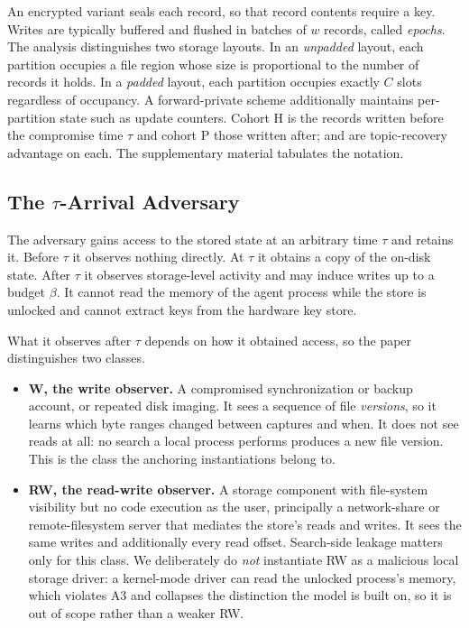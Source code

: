 An encrypted variant seals each record, so that record contents require a key. Writes are
typically buffered and flushed in batches of $w$ records, called \emph{epochs}. The
analysis distinguishes two storage layouts. In an \emph{unpadded} layout, each partition occupies
a file region whose size is proportional to the number of records it holds. In a \emph{padded}
layout, each partition occupies exactly $C$ slots regardless of occupancy. A forward-private scheme
additionally maintains per-partition state such as update counters. Cohort H is the records
written before the compromise time $\tau$ and cohort P those written after; \advhist{} and
\advpost{} are topic-recovery advantage on each. The supplementary material tabulates the notation.

\subsection{The \texorpdfstring{$\tau$}{tau}-Arrival Adversary}
\label{sec:tau-adversary}

The adversary gains access to the stored state at an arbitrary time $\tau$ and retains it. Before
$\tau$ it observes nothing directly. At $\tau$ it obtains a copy of the on-disk state. After
$\tau$ it observes storage-level activity and may induce writes up to a budget $\beta$. It cannot
read the memory of the agent process while the store is unlocked and cannot extract keys from the
hardware key store.

What it observes after $\tau$ depends on how it obtained access, so the paper distinguishes two
classes.

\begin{itemize}
\item \textbf{W, the write observer.} A compromised synchronization or backup account, or repeated disk
imaging. It sees a sequence of file \emph{versions}, so it learns which byte ranges changed
between captures and when. It does not see reads at all: no search a local process performs
produces a new file version. This is the class the anchoring instantiations belong to.
\item \textbf{RW, the read-write observer.} A storage component with file-system visibility but no code
execution as the user, principally a network-share or remote-filesystem server that mediates the
store's reads and writes. It sees the same writes and additionally every read offset. Search-side
leakage matters only for this class. We deliberately do \emph{not} instantiate RW as a malicious
local storage driver: a kernel-mode driver can read the unlocked process's memory, which violates A3
and collapses the distinction the model is built on, so it is out of scope rather than a weaker RW.
\end{itemize}

